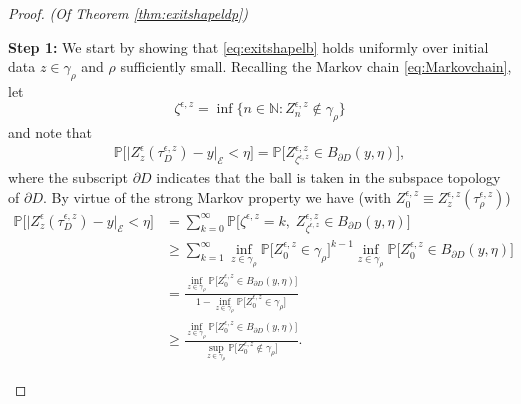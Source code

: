 \documentclass[10pt, reqno]{amsart}
\newcommand{\N}{\mathbb{N}}
\newcommand{\pr}{\mathbb{P}}
\newcommand{\e}{\mathcal{E}}
\theoremstyle{definition}
\numberwithin{lem}{section}
\numberwithin{cor}{section}
\numberwithin{prop}{section}
\numberwithin{thm}{section}
\numberwithin{dfn}{section}
\begin{document}
\begin{proof}{\textit{(Of Theorem \ref{thm:exitshapeldp})}}
\begin{enumerate}
\noindent \textbf{Step 1:} We start by showing that \eqref{eq:exitshapelb} holds uniformly over initial data $z\in\gamma_\rho$ and $\rho$ sufficiently small. Recalling the Markov chain \eqref{eq:Markovchain}, let $$\zeta^{\epsilon, z}=\inf\big\{ n\in\N: Z^{\epsilon,z}_n\notin\gamma_\rho \big\}$$
and note that 
\begin{equation*}
    \begin{aligned}
\pr\bigg[\big|Z^\epsilon_z(\tau^{\epsilon, z}_{D})-y\big|_{\e}<\eta\bigg]=\pr\bigg[Z^{\epsilon, z}_{\zeta^{\epsilon,z}}\in B_{\partial D}(y, \eta)\bigg],
    \end{aligned}
\end{equation*}
where the subscript $\partial D$ indicates that the ball is taken in the subspace topology of $\partial D.$ By virtue of the strong Markov property we have (with $Z^{\epsilon, z}_{0}\equiv  Z_z^{\epsilon, z}(\tau^{\epsilon,z}_\rho)$)
\begin{equation*}
    \begin{aligned}       \pr\bigg[\big|Z^\epsilon_z(\tau^{\epsilon, z}_{D})-y\big|_{\e}<\eta\bigg]&=\sum_{k=0}^{\infty}\pr\bigg[\zeta^{\epsilon,z}=k,\;Z^{\epsilon, z}_{\zeta^{\epsilon,z}}\in B_{\partial D}(y, \eta)\bigg]\\&
    \geq \sum_{k=1}^{\infty}\inf_{z\in\gamma_\rho}\pr\bigg[ Z^{\epsilon, z}_{0}\in \gamma_\rho \bigg]^{k-1}\inf_{z\in\gamma_\rho}\pr\bigg[Z^{\epsilon, z}_{0}\in B_{\partial D}(y, \eta) \bigg] \\&=\frac{\inf_{z\in\gamma_\rho}\pr\bigg[Z^{\epsilon, z}_{0}\in B_{\partial D}(y, \eta)  \bigg]}{1-\inf_{z\in\gamma_\rho}\pr\bigg[ Z^{\epsilon, z}_{0}\in \gamma_\rho \bigg]} \\&
 \geq \frac{\inf_{z\in\gamma_\rho}\pr\bigg[Z^{\epsilon, z}_{0}\in B_{\partial D}(y, \eta)  \bigg]}{\sup_{z\in\gamma_\rho}\pr\bigg[ Z^{\epsilon, z}_0\notin \gamma_\rho \bigg]}.
\end{aligned}
\end{equation*}


\end{enumerate}
\end{proof}
\end{document}

